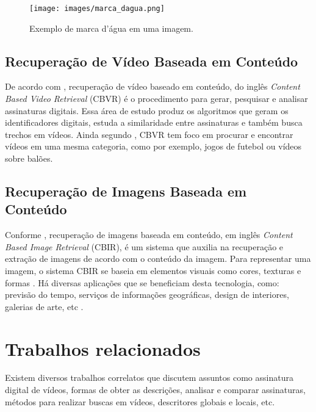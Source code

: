     	\begin{figure}[h]
        \centering
        \texttt{[image: images/marca\_dagua.png]}
        \caption{Exemplo de marca d'água em uma imagem.}
    	\label{fig:marcadagua}
    \end{figure}

\section{Recuperação de Vídeo Baseada em Conteúdo}
De acordo com \cite{law2007video}, recuperação de vídeo baseado em conteúdo, do inglês \textit{Content Based Video Retrieval} (CBVR) é o procedimento para gerar, pesquisar e analisar assinaturas digitais. Essa área de estudo produz os algoritmos que geram os identificadores digitais, estuda a similaridade entre assinaturas e também busca trechos em vídeos. Ainda segundo \cite{law2007video}, CBVR tem foco em procurar e encontrar vídeos em uma mesma categoria, como por exemplo, jogos de futebol ou vídeos sobre balões.

\section{Recuperação de Imagens Baseada em Conteúdo}
Conforme \cite{gudivada1995content}, recuperação de imagens baseada em conteúdo, em inglês \textit{Content Based Image Retrieval} (CBIR), é um sistema que auxilia na recuperação e extração de imagens de acordo com o conteúdo da imagem. Para representar uma imagem, o sistema CBIR se baseia em elementos visuais como cores, texturas e formas \cite{vikhar2016improved}. Há diversas aplicações que se beneficiam desta tecnologia, como: previsão do tempo, serviços de informações geográficas, design de interiores, galerias de arte, etc \cite{gudivada1995content}.

\chapter{Trabalhos relacionados}
\label{chap:relacionados}


Existem diversos trabalhos correlatos que discutem assuntos como assinatura digital de vídeos, formas de obter as descrições, analisar e comparar assinaturas, métodos para realizar buscas em vídeos, descritores globais e locais, etc. 

